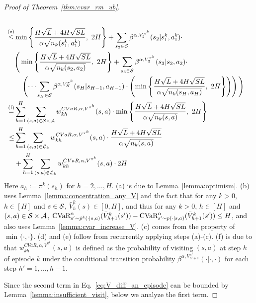 \begin{proof}[Proof of Theorem~\ref{thm:cvar_rm_ub}]
\begin{align}
		\nonumber\\
		\overset{\textup{(e)}}{\leq} & \min \lbr{\frac{H\sqrt{L}+4H\sqrt{SL}}{\alpha \sqrt{n_k(s^k_1,a^k_1)}},\ 2H} + \sum_{s_2 \in \mathcal{S}} \beta^{\alpha,V^{\pi^k}_2}(s_2|s^k_1,a^k_1) \cdot \nonumber\\& \Bigg( \min \lbr{\frac{H\sqrt{L}+4H\sqrt{SL}}{\alpha \sqrt{n_k(s_2,a_2)}},\ 2H} + \sum_{s_3 \in \mathcal{S}} \beta^{\alpha,V^{\pi^k}_3}(s_3|s_2,a_2) \cdot \nonumber\\& \quad \left(\dots \sum_{s_H \in \mathcal{S}} \beta^{\alpha,V^{\pi^k}_H}(s_H|s_{H-1},a_{H-1}) \cdot \left( \min \lbr{\frac{H\sqrt{L}+4H\sqrt{SL}}{\alpha \sqrt{n_k(s_H,a_H)}},\ 2H} \right) \right) \Bigg) 
		\nonumber\\
		\overset{\textup{(f)}}{=} & \sum_{h=1}^{H} \sum_{(s,a) \in \mathcal{S} \times \mathcal{A}} w_{kh}^{CVaR,\alpha,V^{\pi^k}}(s,a) \cdot \min \lbr{\frac{H\sqrt{L}+4H\sqrt{SL}}{\alpha \sqrt{n_k(s,a)}},\ 2H} 
		\nonumber\\
		\leq & \sum_{h=1}^{H} \sum_{(s,a) \in \cL_k} w_{kh}^{CVaR,\alpha,V^{\pi^k}}(s,a) \cdot \frac{H\sqrt{L}+4H\sqrt{SL}}{\alpha \sqrt{n_k(s,a)}} 
		\nonumber\\
		& + \sum_{h=1}^{H} \sum_{(s,a) \notin \cL_k} w_{kh}^{CVaR,\alpha,V^{\pi^k}}(s,a) \cdot 2H \label{eq:V_diff_an_episode}
	\end{align}
	Here $a_h:=\pi^k(s_h)$ for $h=2,\dots,H$. (a) is due to Lemma~\ref{lemma:optimism}. (b) uses Lemma~\ref{lemma:concentration_any_V} and the fact that for any $k>0$, $h \in [H]$ and $s \in \mathcal{S}$, $\bar{V}^k_{h}(s) \in [0,H]$, and thus for any $k>0$, $h \in [H]$ and $(s,a) \in \mathcal{S} \times \mathcal{A}$, $\textup{CVaR}^{\alpha}_{s' \sim \hat{p}^k(\cdot|s,a)}(\bar{V}^k_{h+1}(s'))-\textup{CVaR}^{\alpha}_{s' \sim p(\cdot|s,a)}(\bar{V}^k_{h+1}(s')) \leq H$, and also uses Lemma~\ref{lemma:cvar_increase_V}. (c) comes from the property of $\min\{\cdot,\cdot\}$. (d) and (e) follow from recurrently applying steps (a)-(c). (f) is due to that $w_{kh}^{CVaR,\alpha,V^{\pi^k}}(s,a)$ is defined as the probability of visiting $(s,a)$ at step $h$ of episode $k$ under the conditional transition probability $\beta^{\alpha,V_{h'+1}^{\pi^k}}(\cdot|\cdot,\cdot)$ for each step $h'=1,\dots,h-1$.
	
	Since the second term in Eq.~\eqref{eq:V_diff_an_episode} can be bounded by  Lemma~\ref{lemma:insufficient_visit}, below we analyze the first term.
	

\end{proof}
